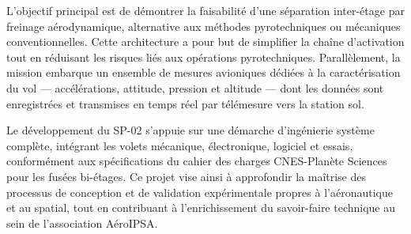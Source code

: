 L’objectif principal est de démontrer la faisabilité d’une séparation inter-étage par freinage aérodynamique, alternative aux
méthodes pyrotechniques ou mécaniques conventionnelles. Cette architecture a pour but de simplifier la chaîne d’activation tout
en réduisant les risques liés aux opérations pyrotechniques. Parallèlement, la mission embarque un ensemble de mesures
avioniques dédiées à la caractérisation du vol — accélérations, attitude, pression et altitude — dont les données sont
enregistrées et transmises en temps réel par télémesure vers la station sol.

Le développement du SP-02 s’appuie sur une démarche d’ingénierie système complète, intégrant les volets mécanique, électronique,
logiciel et essais, conformément aux spécifications du cahier des charges \acrshort{CNES}-Planète Sciences pour les fusées
bi-étages. Ce projet vise ainsi à approfondir la maîtrise des processus de conception et de validation expérimentale propres à
l’aéronautique et au spatial, tout en contribuant à l’enrichissement du savoir-faire technique au sein de l’association AéroIPSA.

\newpage
